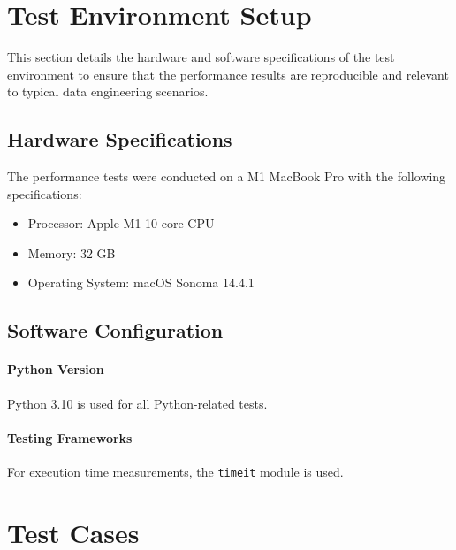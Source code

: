 \section{Test Environment Setup}


This section details the hardware and software specifications of the test environment to ensure that the performance results are reproducible and relevant to typical data engineering scenarios.

\subsection{Hardware Specifications}

    The performance tests were conducted on a M1 MacBook Pro with the following specifications:

    \begin{itemize}
        \item Processor: Apple M1 10-core CPU
        \item Memory: 32 GB
        \item Operating System: macOS Sonoma 14.4.1
    \end{itemize}

    \subsection{Software Configuration}

    \paragraph{Python Version} Python 3.10 is used for all Python-related tests.
    
    \paragraph{Testing Frameworks} For execution time measurements, the \texttt{timeit} module is used.
   

\section{Test Cases}

